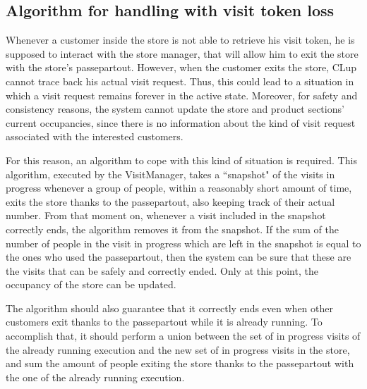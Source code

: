 \documentclass[a4paper,oneside,11pt]{book}
\begin{document}
    \subsection{Algorithm for handling with visit token loss}
    Whenever a customer inside the store is not able to retrieve his visit token, he is supposed to interact with the store manager, that will allow him to exit the store with the store’s passepartout. However, when the customer exits the store, CLup cannot trace back his actual visit request. Thus, this could lead to a situation in which a visit request remains forever in the active state. Moreover, for safety and consistency reasons, the system cannot update the store and product sections’ current occupancies, since there is no information about the kind of visit request associated with the interested customers. \par
    For this reason, an algorithm to cope with this kind of situation is required. This algorithm, executed by the VisitManager, takes a ``snapshot" of the visits in progress whenever a group of people, within a reasonably short amount of time, exits the store thanks to the passepartout, also keeping track of their actual number. From that moment on, whenever a visit included in the snapshot correctly ends, the algorithm removes it from the snapshot. If the sum of the number of people in the visit in progress which are left in the snapshot is equal to the ones who used the passepartout, then the system can be sure that these are the visits that can be safely and correctly ended. Only at this point, the occupancy of the store can be updated. \par
    The algorithm should also guarantee that it correctly ends even when other customers exit thanks to the passepartout while it is already running. To accomplish that, it should perform a union between the set of in progress visits of the already running execution and the new set of in progress visits in the store, and sum the amount of people exiting the store thanks to the passepartout with the one of the already running execution.
\end{document}
